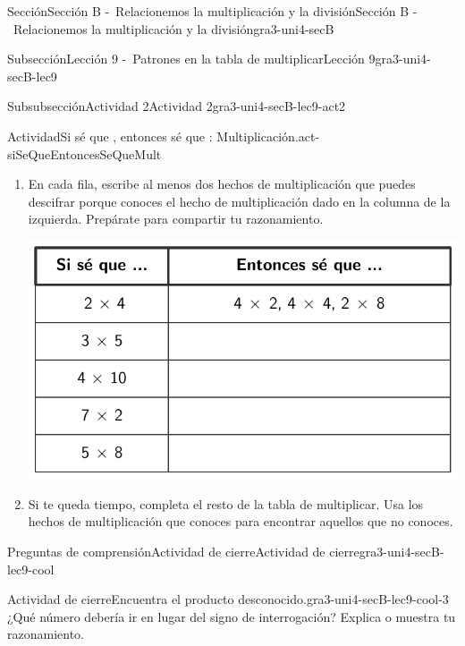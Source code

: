 \documentclass[twoside,10pt,]{article}
\begin{document}
\begin{sectionptx}{Sección}{Sección B -~Relacionemos la multiplicación y la división}{}{Sección B -~Relacionemos la multiplicación y la división}{}{}{gra3-uni4-secB}
\begin{subsectionptx}{Subsección}{Lección 9 -~Patrones en la tabla de multiplicar}{}{Lección 9}{}{}{gra3-uni4-secB-lec9}
\begin{subsubsectionptx}{Subsubsección}{Actividad 2}{}{Actividad 2}{}{}{gra3-uni4-secB-lec9-act2}
\begin{activity}{Actividad}{Si sé que \textellipsis{}, entonces sé que \textellipsis{}: Multiplicación.}{act-siSeQueEntoncesSeQueMult}
%
\begin{enumerate}
\item{}En cada fila, escribe al menos dos hechos de multiplicación que puedes descifrar porque conoces el hecho de multiplicación dado en la columna de la izquierda. Prepárate para compartir tu razonamiento.%
\begin{image}{0}{1}{0}{}%
\includegraphics[width=\linewidth]{external/tikz-source/siSeQueEntoncesSeQueMult-tab.pdf}
\end{image}%
\item{}Si te queda tiempo, completa el resto de la tabla de multiplicar. Usa los hechos de multiplicación que conoces para encontrar aquellos que no conoces.%
\end{enumerate}
\end{activity}%
\end{subsubsectionptx}
%
%
\typeout{************************************************}
\typeout{************************************************}
%
\begin{reading-questions-subsubsection}{Preguntas de comprensión}{Actividad de cierre}{}{Actividad de cierre}{}{}{gra3-uni4-secB-lec9-cool}
\begin{project}{Actividad de cierre}{Encuentra el producto desconocido.}{gra3-uni4-secB-lec9-cool-3}%
¿Qué número debería ir en lugar del signo de interrogación? Explica o muestra tu razonamiento.%
\begin{image}{0}{1}{0}{}%

\end{image}
\end{project}
\end{reading-questions-subsubsection}
\end{subsectionptx}
\end{sectionptx}
\end{document}
